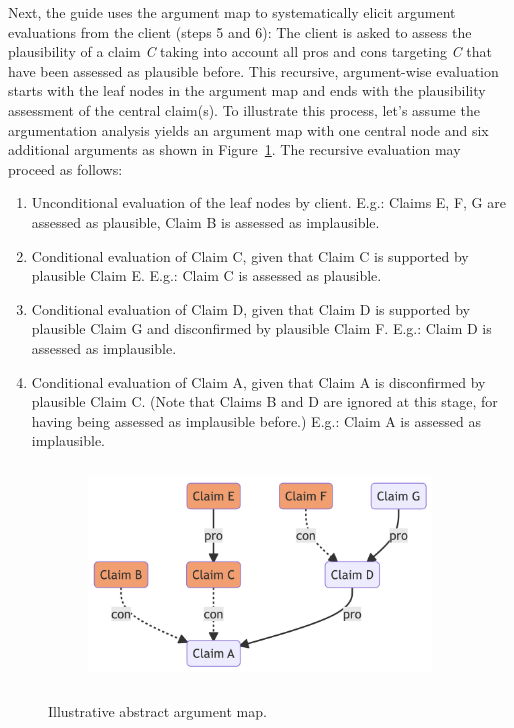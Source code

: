 \documentclass[
  letterpaper,
  DIV=11,
  numbers=noendperiod]{scrartcl}
\providecommand{\tightlist}{%
  \setlength{\itemsep}{0pt}\setlength{\parskip}{0pt}}\usepackage{longtable,booktabs,array}
\begin{document}
Next, the guide uses the argument map to systematically elicit argument
evaluations from the client (steps 5 and 6): The client is asked to
assess the plausibility of a claim \emph{C} taking into account all pros
and cons targeting \emph{C} that have been assessed as plausible before.
This recursive, argument-wise evaluation starts with the leaf nodes in
the argument map and ends with the plausibility assessment of the
central claim(s). To illustrate this process, let's assume the
argumentation analysis yields an argument map with one central node and
six additional arguments as shown in Figure~\ref{fig-abstract-am}. The
recursive evaluation may proceed as follows:

\begin{enumerate}
\def\labelenumi{\arabic{enumi}.}
\tightlist
\item
  Unconditional evaluation of the leaf nodes by client. E.g.: Claims E,
  F, G are assessed as plausible, Claim B is assessed as implausible.
\item
  Conditional evaluation of Claim C, given that Claim C is supported by
  plausible Claim E. E.g.: Claim C is assessed as plausible.
\item
  Conditional evaluation of Claim D, given that Claim D is supported by
  plausible Claim G and disconfirmed by plausible Claim F. E.g.: Claim D
  is assessed as implausible.
\item
  Conditional evaluation of Claim A, given that Claim A is disconfirmed
  by plausible Claim C. (Note that Claims B and D are ignored at this
  stage, for having being assessed as implausible before.) E.g.: Claim A
  is assessed as implausible.
\end{enumerate}

\begin{figure}

{\centering 

\begin{figure}[H]

{\centering \includegraphics[width=4in,height=2.28in]{intro_guided_reasoning_files/figure-latex/mermaid-figure-3.png}

}

\end{figure}

}

\caption{\label{fig-abstract-am}Illustrative abstract argument map.}

\end{figure}
\end{document}
